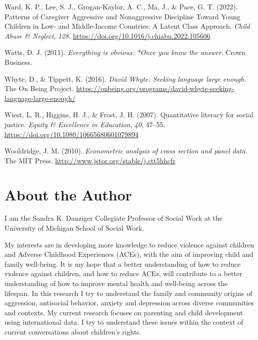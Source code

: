 \documentclass[
  letterpaper,
  DIV=11,
  numbers=noendperiod]{scrreprt}
\newlength{\cslhangindent}
\newenvironment{CSLReferences}[2] %
 {\begin{list}{}{%
  \setlength{\itemindent}{0pt}
  \setlength{\leftmargin}{0pt}
  \setlength{\parsep}{0pt}
  \ifodd #1
   \setlength{\leftmargin}{\cslhangindent}
   \setlength{\itemindent}{-1\cslhangindent}
  \fi
  \setlength{\itemsep}{#2\baselineskip}}}
 {\end{list}}
\begin{document}
\begin{CSLReferences}{1}{0}
Ward, K. P., Lee, S. J., Grogan-Kaylor, A. C., Ma, J., \& Pace, G. T.
(2022). {Patterns of Caregiver Aggressive and Nonaggressive Discipline
Toward Young Children in Low- and Middle-Income Countries: A Latent
Class Approach}. \emph{Child Abuse \& Neglect}, \emph{128}.
\url{https://doi.org/10.1016/j.chiabu.2022.105606}

Watts, D. J. (2011). \emph{Everything is obvious: *Once you know the
answer}. Crown Business.

Whyte, D., \& Tippett, K. (2016). \emph{{D}avid {W}hyte: Seeking
language large enough}. The On Being Project.
\url{https://onbeing.org/programs/david-whyte-seeking-language-large-enough/}

Wiest, L. R., Higgins, H. J., \& Frost, J. H. (2007). Quantitative
literacy for social justice. \emph{Equity \& Excellence in Education},
\emph{40}, 47--55. \url{https://doi.org/10.1080/10665680601079894}

Wooldridge, J. M. (2010). \emph{Econometric analysis of cross section
and panel data}. The MIT Press.
\url{http://www.jstor.org/stable/j.ctt5hhcfr}

\end{CSLReferences}


\chapter{About the Author}\label{about-the-author}

I am the Sandra K. Danziger Collegiate Professor of Social Work at the
University of Michigan School of Social Work.

My interests are in developing more knowledge to reduce violence against
children and Adverse Childhood Experiences (ACEs), with the aim of
improving child and family well-being. It is my hope that a better
understanding of how to reduce violence against children, and how to
reduce ACEs, will contribute to a better understanding of how to improve
mental health and well-being across the lifespan. In this research I try
to understand the family and community origins of aggression, antisocial
behavior, anxiety and depression across diverse communities and
contexts. My current research focuses on parenting and child development
using international data. I try to understand these issues within the
context of current conversations about children's rights.
\end{document}
